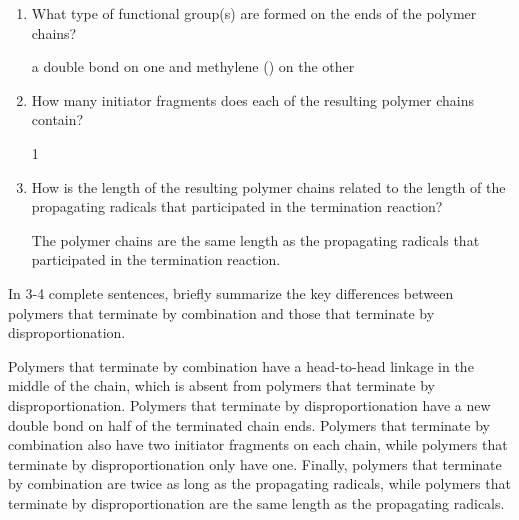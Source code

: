 \begin{activity}
\begin{ctqs}
\begin{enumerate}
			\item What type of functional group(s) are formed on the ends of the polymer chains?
	
				\begin{solution}[0.5in]
					a double bond on one and methylene () on the other
				\end{solution}
			
			\item How many initiator fragments does each of the resulting polymer chains contain?
	
				\begin{solution}[0.5in]
					1
				\end{solution}
			
			\item How is the length of the resulting polymer chains related to the length of the propagating radicals that participated in the termination reaction?
	
				\begin{solution}[0.5in]
					The polymer chains are the same length as the propagating radicals that participated in the termination reaction.
				\end{solution}
				
		\end{enumerate}
	
	\question In 3-4 complete sentences, briefly summarize the key differences between polymers that terminate by combination and those that terminate by disproportionation.
	
				\begin{solution}[2.75in]
					Polymers that terminate by combination have a head-to-head linkage in the middle of the chain, which is absent from polymers that terminate by disproportionation.  Polymers that terminate by disproportionation have a new double bond on half of the terminated chain ends.  Polymers that terminate by combination also have two initiator fragments on each chain, while polymers that terminate by disproportionation only have one.  Finally, polymers that terminate by combination are twice as long as the propagating radicals, while polymers that terminate by disproportionation are the same length as the propagating radicals.
				\end{solution}
	

\end{ctqs}

		

\begin{model}
\label{\labelbase:mdl:FRPxferchem}


\end{model}
\end{activity}
